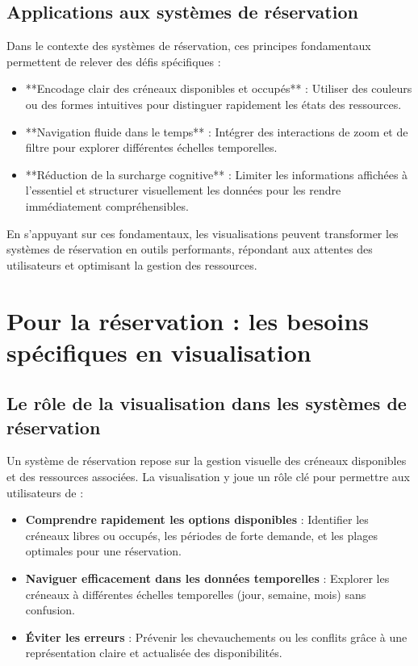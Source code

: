 \documentclass[runningheads]{llncs}
\begin{document}
\subsection{Applications aux systèmes de réservation}
Dans le contexte des systèmes de réservation, ces principes fondamentaux permettent de relever des défis spécifiques :
\begin{itemize}
    \item **Encodage clair des créneaux disponibles et occupés** : Utiliser des couleurs ou des formes intuitives pour distinguer rapidement les états des ressources.
    \item **Navigation fluide dans le temps** : Intégrer des interactions de zoom et de filtre pour explorer différentes échelles temporelles.
    \item **Réduction de la surcharge cognitive** : Limiter les informations affichées à l’essentiel et structurer visuellement les données pour les rendre immédiatement compréhensibles.
\end{itemize}

En s'appuyant sur ces fondamentaux, les visualisations peuvent transformer les systèmes de réservation en outils performants, répondant aux attentes des utilisateurs et optimisant la gestion des ressources.



\section{Pour la réservation : les besoins spécifiques en visualisation}

\subsection{Le rôle de la visualisation dans les systèmes de réservation}
Un système de réservation repose sur la gestion visuelle des créneaux disponibles et des ressources associées. La visualisation y joue un rôle clé pour permettre aux utilisateurs de :
\begin{itemize}
    \item \textbf{Comprendre rapidement les options disponibles} : Identifier les créneaux libres ou occupés, les périodes de forte demande, et les plages optimales pour une réservation.
    \item \textbf{Naviguer efficacement dans les données temporelles} : Explorer les créneaux à différentes échelles temporelles (jour, semaine, mois) sans confusion.
    \item \textbf{Éviter les erreurs} : Prévenir les chevauchements ou les conflits grâce à une représentation claire et actualisée des disponibilités.
\end{itemize}
\end{document}
